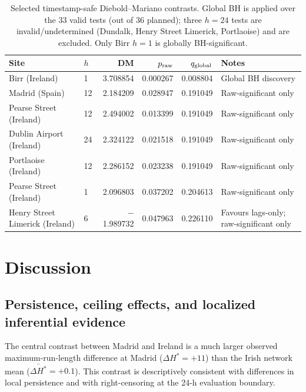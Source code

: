 \documentclass[12pt,a4paper]{article}
\begin{document}
\begin{table}[htbp]
\centering
\caption{Selected timestamp-safe Diebold--Mariano contrasts.
  Global BH is applied over the 33 valid tests (out of 36 planned); three
  $h=24$ tests are invalid/undetermined (Dundalk, Henry Street Limerick,
  Portlaoise) and are excluded.  Only Birr $h=1$ is globally BH-significant.}
\label{tab:ireland_dm}
\footnotesize
\begin{tabular}{llrrrl}
\toprule
Site & $h$ & DM & $p_{\rm raw}$ & $q_{\rm global}$ & Notes \\
\midrule
Birr (Ireland) & 1  &  3.708854 & 0.000267 & 0.008804 & Global BH discovery \\
Madrid (Spain) & 12 &  2.184209 & 0.028947 & 0.191049 & Raw-significant only \\
Pearse Street (Ireland) & 12 & 2.494002 & 0.013399 & 0.191049 & Raw-significant only \\
Dublin Airport (Ireland) & 24 & 2.324122 & 0.021518 & 0.191049 & Raw-significant only \\
Portlaoise (Ireland) & 12 & 2.286152 & 0.023238 & 0.191049 & Raw-significant only \\
Pearse Street (Ireland) & 1 & 2.096803 & 0.037202 & 0.204613 & Raw-significant only \\
Henry Street Limerick (Ireland) & 6 & $-$1.989732 & 0.047963 & 0.226110 & Favours lags-only; raw-significant only \\
\bottomrule
\end{tabular}
\end{table}

\section{Discussion}
\label{sec:discussion}

\subsection{Persistence, ceiling effects, and localized inferential evidence}

The central contrast between Madrid and Ireland is a much larger observed
maximum-run-length difference at Madrid ($\Delta H^*=+11$) than the Irish
network mean ($\bar{\Delta H^*}=+0.1$).  This contrast is descriptively
consistent with differences in local persistence and with right-censoring at
the 24-h evaluation boundary.
\end{document}
